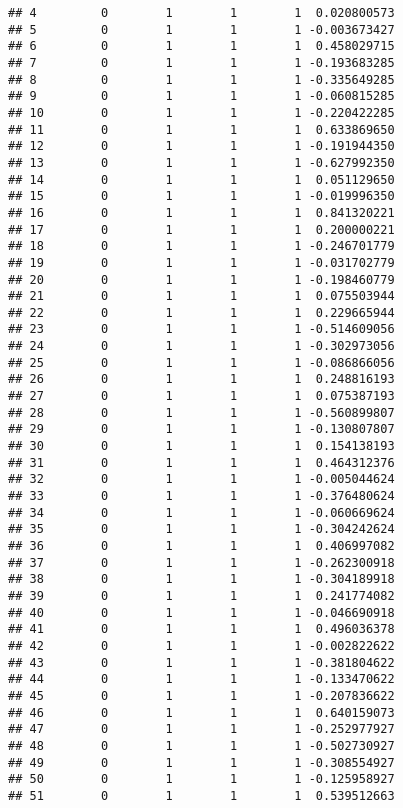 \documentclass[]{book}
\theoremstyle{definition}
\theoremstyle{definition}
\theoremstyle{definition}
\theoremstyle{remark}
\begin{document}
\begin{verbatim}
## 4         0        1        1        1  0.020800573
## 5         0        1        1        1 -0.003673427
## 6         0        1        1        1  0.458029715
## 7         0        1        1        1 -0.193683285
## 8         0        1        1        1 -0.335649285
## 9         0        1        1        1 -0.060815285
## 10        0        1        1        1 -0.220422285
## 11        0        1        1        1  0.633869650
## 12        0        1        1        1 -0.191944350
## 13        0        1        1        1 -0.627992350
## 14        0        1        1        1  0.051129650
## 15        0        1        1        1 -0.019996350
## 16        0        1        1        1  0.841320221
## 17        0        1        1        1  0.200000221
## 18        0        1        1        1 -0.246701779
## 19        0        1        1        1 -0.031702779
## 20        0        1        1        1 -0.198460779
## 21        0        1        1        1  0.075503944
## 22        0        1        1        1  0.229665944
## 23        0        1        1        1 -0.514609056
## 24        0        1        1        1 -0.302973056
## 25        0        1        1        1 -0.086866056
## 26        0        1        1        1  0.248816193
## 27        0        1        1        1  0.075387193
## 28        0        1        1        1 -0.560899807
## 29        0        1        1        1 -0.130807807
## 30        0        1        1        1  0.154138193
## 31        0        1        1        1  0.464312376
## 32        0        1        1        1 -0.005044624
## 33        0        1        1        1 -0.376480624
## 34        0        1        1        1 -0.060669624
## 35        0        1        1        1 -0.304242624
## 36        0        1        1        1  0.406997082
## 37        0        1        1        1 -0.262300918
## 38        0        1        1        1 -0.304189918
## 39        0        1        1        1  0.241774082
## 40        0        1        1        1 -0.046690918
## 41        0        1        1        1  0.496036378
## 42        0        1        1        1 -0.002822622
## 43        0        1        1        1 -0.381804622
## 44        0        1        1        1 -0.133470622
## 45        0        1        1        1 -0.207836622
## 46        0        1        1        1  0.640159073
## 47        0        1        1        1 -0.252977927
## 48        0        1        1        1 -0.502730927
## 49        0        1        1        1 -0.308554927
## 50        0        1        1        1 -0.125958927
## 51        0        1        1        1  0.539512663

\end{verbatim}
\end{document}

